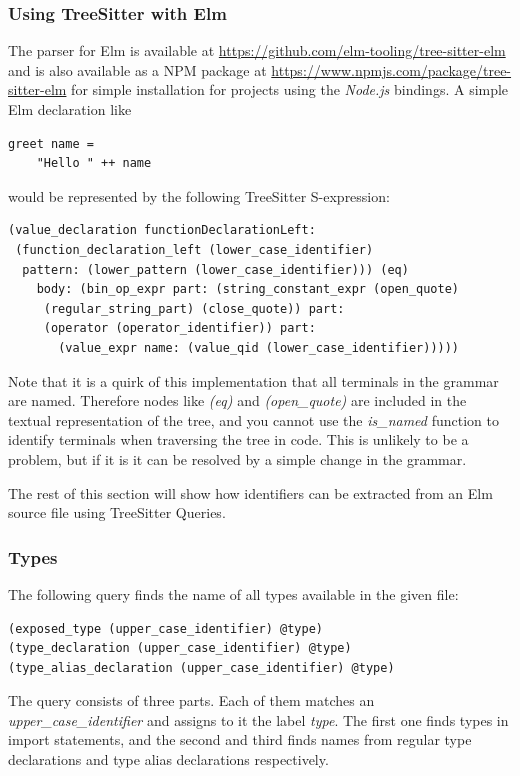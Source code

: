 \documentclass[../thesis.tex]{subfiles}
\begin{document}
\subsubsection{Using TreeSitter with Elm}
The parser for Elm is available at \url{https://github.com/elm-tooling/tree-sitter-elm}
and is also available as a NPM package at \url{https://www.npmjs.com/package/tree-sitter-elm} for simple installation
for projects using the \textit{Node.js} bindings.
A simple Elm declaration like
\begin{verbatim}
greet name = 
    "Hello " ++ name
\end{verbatim}
would be represented by the following TreeSitter S-expression:
\begin{verbatim}
(value_declaration functionDeclarationLeft: 
 (function_declaration_left (lower_case_identifier) 
  pattern: (lower_pattern (lower_case_identifier))) (eq) 
    body: (bin_op_expr part: (string_constant_expr (open_quote) 
     (regular_string_part) (close_quote)) part: 
     (operator (operator_identifier)) part: 
       (value_expr name: (value_qid (lower_case_identifier)))))
\end{verbatim}
Note that it is a quirk of this implementation that all terminals in the grammar are named.
Therefore nodes like \textit{(eq)} and \textit{(open\_quote)} are included in
the textual representation of the tree, and you cannot use the \textit{is\_named} function
to identify terminals when traversing the tree in code.
This is unlikely to be a problem, but if it is it can be resolved by a simple change in the grammar.

The rest of this section will show how identifiers can be extracted from an Elm source file using TreeSitter Queries.

\subsubsection{Types}
The following query finds the name of all types available in the given file:
\begin{verbatim}
(exposed_type (upper_case_identifier) @type)
(type_declaration (upper_case_identifier) @type)
(type_alias_declaration (upper_case_identifier) @type)
\end{verbatim}
The query consists of three parts.
Each of them matches an \textit{upper\_case\_identifier} and assigns to it the label \textit{type}.
The first one finds types in import statements, and the second and third finds names from regular type declarations
and type alias declarations respectively.
\end{document}
